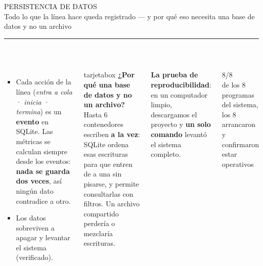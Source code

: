 \documentclass[aspectratio=169,10pt]{beamer}
\newcommand{\titulo}[2]{%
  \vspace{0.12cm}%
  {\dinfont\LARGE\color{marino}\MakeUppercase{#1}}\\[0.3ex]
  {\normalsize\color{grisazul}#2}\\[0.2ex]
  {\color{tealu}\rule{2.2cm}{2pt}}\\[0.6ex]}
\newcommand{\cifra}[2]{%
  \begin{center}{\dinfont\fontsize{34}{36}\selectfont\color{tealu}#1}\\[2pt]
  {\footnotesize\color{grisazul}#2}\end{center}}
\begin{document}
\begin{frame}
\titulo{Persistencia de datos}{Todo lo que la línea hace queda registrado — y por qué eso necesita una base de datos y no un archivo}
\begin{columns}[T]
\begin{itemize}
  \item Cada acción de la línea (\emph{entra a cola} · \emph{inicia} · \emph{termina}) es un \textbf{evento} en SQLite. Las métricas se calculan siempre desde los eventos: \textbf{nada se guarda dos veces}, así ningún dato contradice a otro.
  \item Los datos sobreviven a apagar y levantar el sistema (verificado).
\end{itemize}
\vspace{0.05cm}
\begin{beamercolorbox}[sep=5pt, rounded=true]{tarjetabox}
{\small\bfseries\color{marino}¿Por qué una base de datos y no un archivo?}\\[2pt]
{\footnotesize\color{grisazul}Hasta 6 contenedores escriben \textbf{a la vez}: SQLite ordena esas escrituras para que entren de a una sin pisarse, y permite consultarlas con filtros. Un archivo compartido perdería o mezclaría escrituras.}
\end{beamercolorbox}
{\footnotesize\color{grisazul}\textbf{La prueba de reproducibilidad}: en un computador limpio, descargamos el proyecto y \textbf{un solo comando} levantó el sistema completo.}\\[4pt]
\cifra{8/8}{de los 8 programas del sistema, los 8 arrancaron y confirmaron estar operativos}
\end{columns}
\end{frame}
\end{document}
